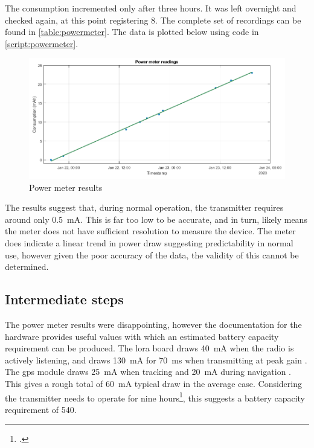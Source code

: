 The consumption incremented only after three hours. It was left overnight and checked again,
at this point registering \qty{8}{\mAh}. The complete set of recordings
can be found in \cref{table:powermeter}. The data is plotted below using
code in \cref{script:powermeter}.
\begin{figure}[H]
    \centering
    \label{fig:powermeter}
    \includegraphics[width=\textwidth]{../../Tests/power meter/powermeter.png}
    \caption{Power meter results}
\end{figure}

The results suggest that, during normal operation, the transmitter requires around only
\qty{0.5}{\mA}. This is far too low to be accurate, and in turn,
likely means the meter does not have sufficient resolution
to measure the device. The meter does indicate a linear trend in power draw
suggesting predictability in normal use,
however given the poor accuracy of the data, the validity of this cannot be determined.

\subsection{Intermediate steps}
\label{sec:intermediate}
The power meter results were disappointing, however the documentation for the hardware
provides useful values with which an estimated battery capacity requirement can be produced.
The \gls{lora} board draws \qty{40}{\mA} when the radio is actively
listening, and draws \qty{130}{\mA} for \qty{70}{\ms} when transmitting at peak gain \cite{adafruit:loram0}.
The \acrshort{gps} module draws \qty{25}{\mA} when tracking and \qty{20}{\mA} during navigation \cite{adafruit:gps}.
This gives a rough total of \qty{60}{\mA} typical draw in the average case. Considering the
transmitter needs to operate for nine hours\footnote{.},
this suggests a battery capacity requirement of \qty{540}{\mAh}.

